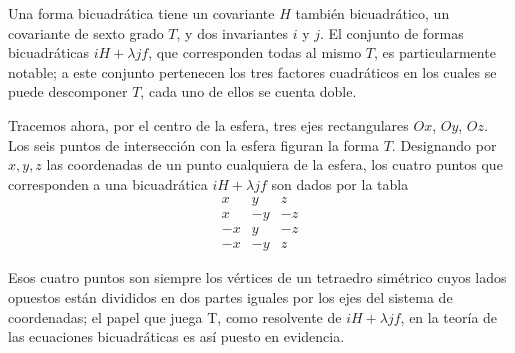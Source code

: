 \documentclass[a4paper, 12pt]{article}
\begin{document}
 Una forma bicuadrática tiene un covariante $H$ también bicuadrático, un covariante de sexto grado $T$, y dos invariantes $i$ y $j$. El conjunto de formas bicuadráticas $i H + \lambda j f$, que corresponden todas al mismo $T$, es particularmente notable; a este conjunto pertenecen los tres factores cuadráticos en los cuales se puede descomponer $T$, cada uno de ellos se cuenta doble.

 Tracemos ahora, por el centro de la esfera, tres ejes rectangulares $Ox$, $Oy$, $Oz$. Los seis puntos de intersección con la esfera figuran la forma $T$. Designando por $x, y, z$ las coordenadas de un punto cualquiera de la esfera, los cuatro puntos que corresponden a una bicuadrática $iH +\lambda j f$ son dados por la tabla $$ \begin{array}{rrr} x& y & z \\ x & -y& -z \\ -x & y & -z \\ -x & -y & z \end{array} $$

 Esos cuatro puntos son siempre los vértices de un tetraedro simétrico cuyos lados opuestos están divididos en dos partes iguales por los ejes del sistema de coordenadas; el papel que juega T, como resolvente de $i H + \lambda j f$, en la teoría de las ecuaciones bicuadráticas es así puesto en evidencia. 



 \newpage

\theendnotes 
\end{document}
